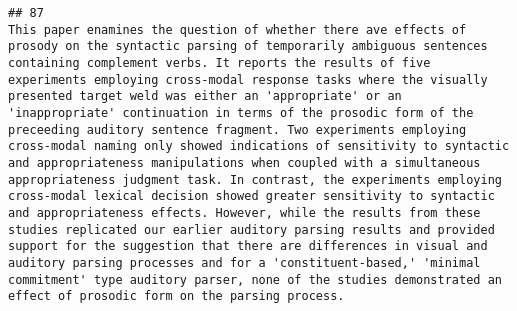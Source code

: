 \documentclass[
  english,
  man]{apa6}
\begin{document}
\begin{verbatim}
## 87                                                                                                                                                                                                                                                                                                                                                                                                                                                                                                                                                                                                                                                                                                                                                                                                                                                                                                                                                                                                                                                                                                                                                                                                                                                                                                                                                                                                                                                                                                                 This paper enamines the question of whether there ave effects of prosody on the syntactic parsing of temporarily ambiguous sentences containing complement verbs. It reports the results of five experiments employing cross-modal response tasks where the visually presented target weld was either an 'appropriate' or an 'inappropriate' continuation in terms of the prosodic form of the preceeding auditory sentence fragment. Two experiments employing cross-modal naming only showed indications of sensitivity to syntactic and appropriateness manipulations when coupled with a simultaneous appropriateness judgment task. In contrast, the experiments employing cross-modal lexical decision showed greater sensitivity to syntactic and appropriateness effects. However, while the results from these studies replicated our earlier auditory parsing results and provided support for the suggestion that there are differences in visual and auditory parsing processes and for a 'constituent-based,' 'minimal commitment' type auditory parser, none of the studies demonstrated an effect of prosodic form on the parsing process.

\end{verbatim}
\end{document}
